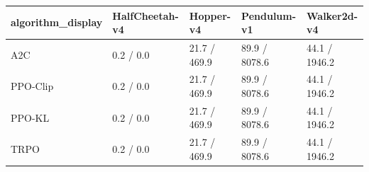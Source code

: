 \begin{tabular}{lllll}
\toprule
algorithm_display & HalfCheetah-v4 & Hopper-v4 & Pendulum-v1 & Walker2d-v4 \\
\midrule
A2C & 0.2 / 0.0 & 21.7 / 469.9 & 89.9 / 8078.6 & 44.1 / 1946.2 \\
PPO-Clip & 0.2 / 0.0 & 21.7 / 469.9 & 89.9 / 8078.6 & 44.1 / 1946.2 \\
PPO-KL & 0.2 / 0.0 & 21.7 / 469.9 & 89.9 / 8078.6 & 44.1 / 1946.2 \\
TRPO & 0.2 / 0.0 & 21.7 / 469.9 & 89.9 / 8078.6 & 44.1 / 1946.2 \\
\bottomrule
\end{tabular}
